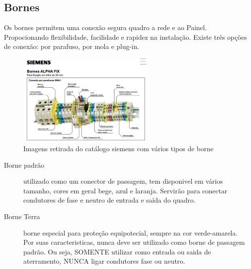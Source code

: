 \subsection{Bornes}
Os bornes permitem uma conexão segura quadro a rede e ao Painel. Propocionando flexibilidade, facilidade e rapidez na instalação. Existe três opções de conexão: por parafuso, por mola e plug-in.

\begin{figure}[h]
    \centering
    \includegraphics[width=0.6\textwidth]{image/BORNESIMENS.png}
    \caption{Imagens retirada do catálogo siemens com vários tipos de borne}
   \label{fig:bornes}
\end{figure}
\begin{description}
\item[Borne padrão] utilizado como um conector de passagem, tem disponivel em vários tamanho, cores em geral bege, azul e laranja. Servirão para conectar condutores de fase e neutro de entrada e saída do quadro.
\item[Borne Terra] borne especial para proteção equipotecial, sempre na cor verde-amarela. Por suas caracteristicas, nunca deve ser utilizado como borne de passagem padrão. Ou seja, SOMENTE utilizar como entrada ou saida de aterramento, NUNCA ligar condutores fase ou neutro.
\end{description}
